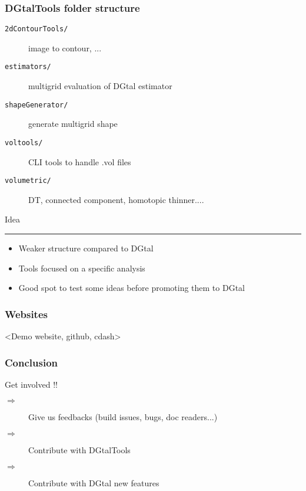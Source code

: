 \documentclass[8pt]{beamer}
\newcommand{\HH}{ \vspace{0.5pt}\hrule}
\begin{document}
\begin{frame}
  \frametitle{DGtalTools folder structure}

   \begin{description}
        \item[ \tt 2dContourTools/] image to contour, ...
        \item[ \tt estimators/] multigrid evaluation of  DGtal estimator
        \item[ \tt shapeGenerator/] generate multigrid shape
        \item[ \tt voltools/] CLI tools to handle .vol files
        \item[ \tt volumetric/] DT, connected component, homotopic thinner....
   \end{description}  

   \begin{block}{Idea\HH}
     \begin{itemize}
     \item Weaker  structure compared to DGtal
     \item Tools focused on a specific analysis
     \item Good spot to test some ideas before promoting them to DGtal
     \end{itemize}
     
   \end{block}

\end{frame}

\begin{frame}
  \frametitle{Websites}

<Demo website, github, cdash>
\end{frame}

\begin{frame}
  \frametitle{Conclusion}
  \begin{center}
    {\Huge \alert{Get involved !!}}
  \end{center}
\vspace{1cm}

\begin{description}
\item[$\Rightarrow$] Give us feedbacks (build issues, bugs, doc readers...)
\item[$\Rightarrow$] Contribute with DGtalTools
\item[$\Rightarrow$] Contribute with DGtal new features
\end{description}


\end{frame}
\end{document}
